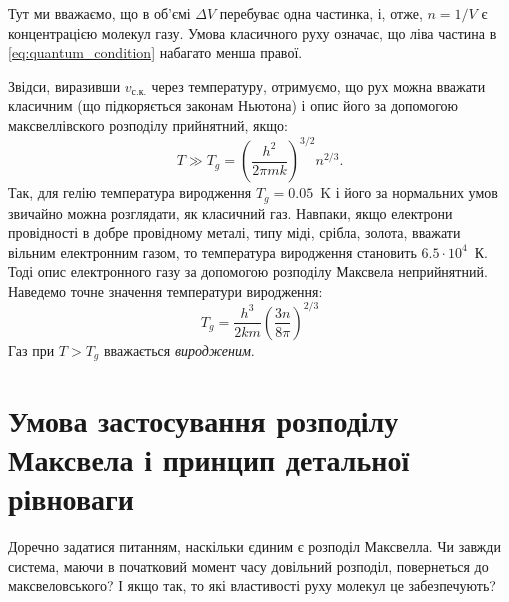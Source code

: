 %

Тут ми вважаємо, що в об’ємі $\Delta V$ перебуває одна частинка, і, отже, $n = 1/V$ є концентрацією молекул газу. Умова класичного руху означає, що ліва частина в \eqref{eq:quantum_condition} набагато менша правої.

Звідси, виразивши $v_\text{с.к.}$ через температуру, отримуємо, що рух можна вважати класичним (що підкоряється законам Ньютона) і опис його за допомогою максвеллівского розподілу прийнятний, якщо:
\begin{equation}
    T \gg T_g = \left( \frac{h^2}{2\pi m k} \right)^{3/2} n^{2/3}.
    \label{eq:classical_condition}
\end{equation}
Так, для гелію температура виродження $T_g=0.05$~K і його за нормальних умов звичайно можна розглядати, як класичний газ. Навпаки, якщо електрони провідності в добре провідному металі, типу міді, срібла, золота, вважати вільним електронним газом, то температура виродження становить $6.5 \cdot 10^4$~К. Тоді опис електронного газу за допомогою розподілу Максвела неприйнятний. Наведемо точне значення температури виродження:
\begin{equation}
    T_g=\frac{h^3}{2km}\left(\frac{3n}{8\pi}\right)^{2/3}
\end{equation}
Газ при $T>T_g$ вважається \emph{виродженим}.

\section{Умова застосування розподілу Максвела і принцип детальної рівноваги}

Доречно задатися питанням, наскільки єдиним є розподіл Максвелла. Чи завжди система, маючи в початковий момент часу довільний розподіл, повернеться до максвеловського? І якщо так, то які властивості руху молекул це забезпечують?

